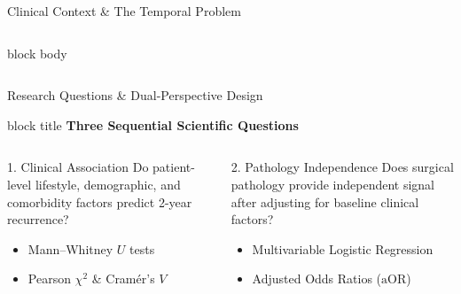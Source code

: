 \documentclass[10pt,aspectratio=169,xcolor={table,dvipsnames}]{beamer}
\newcommand{\aOR}{\text{aOR}}
\begin{document}
\begin{frame}{Clinical Context \& The Temporal Problem}
\begin{columns}[c]
\begin{beamercolorbox}[sep=8pt,rounded=true,center]{block body}
      \end{beamercolorbox}
  \end{columns}
\end{frame}

\begin{frame}{Research Questions \& Dual-Perspective Design}
  \vspace{-0.1cm}
  \begin{beamercolorbox}[sep=4pt,rounded=true,center]{block title}
    \textbf{Three Sequential Scientific Questions}
  \end{beamercolorbox}
  \vspace{0.15cm}

  \begin{columns}[t]
      \begin{block}{\centering \small 1. Clinical Association}
        \vspace{0.1cm}
        {\scriptsize Do patient-level lifestyle, demographic, and comorbidity factors predict 2-year recurrence?}
        \begin{itemize}\setlength{\itemsep}{0pt}
          \item {\tiny Mann--Whitney $U$ tests}
          \item {\tiny Pearson $\chi^2$ \& Cramér's $V$}
        \end{itemize}
      \end{block}

      \begin{block}{\centering \small 2. Pathology Independence}
        \vspace{0.1cm}
        {\scriptsize Does surgical pathology provide independent signal after adjusting for baseline clinical factors?}
        \begin{itemize}\setlength{\itemsep}{0pt}
          \item {\tiny Multivariable Logistic Regression}
          \item {\tiny Adjusted Odds Ratios ($\aOR$)}
        \end{itemize}
      \end{block}


\end{columns}
\end{frame}
\end{document}

